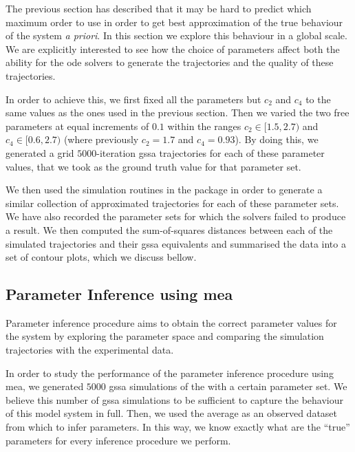 The previous section has described that it may be hard to predict which maximum order to use in order to get best approximation of the true behaviour of the system \emph{a priori}. 
In this section we explore this behaviour in a global scale.
We are explicitly interested to see how the choice of parameters affect both the ability for the \gls{ode} solvers to generate the trajectories and the quality of these trajectories.

In order to achieve this, we first fixed all the parameters but $c_2$ and $c_4$ to the same values as the ones used in the previous section.
Then we varied the two free parameters at equal increments of $0.1$ within the ranges
$c_2 \in [1.5, 2.7)$ and $c_4 \in [0.6, 2.7)$ (where previously $c_2=1.7$ and $c_4=0.93$). By doing this, we generated a grid $5000$-iteration \gls{gssa} trajectories for each of these parameter values, that we took as the ground truth value for that parameter set.

We then used the simulation routines in the \means{} package in order to generate a similar collection of approximated trajectories for each of these parameter sets. 
We have also recorded the parameter sets for which the solvers failed to produce a result. 
We then computed the sum-of-squares distances between each of the simulated trajectories and their \gls{gssa} equivalents and summarised the data into a set of contour plots, which we discuss bellow.

\subsection{Parameter Inference using \acrlong{mea}}
Parameter inference procedure aims to obtain the correct parameter values for the system by exploring the parameter space and comparing the simulation trajectories with the experimental data.

In order to study the performance of the parameter inference procedure using \acrlong{mea},
we generated $5000$ \acrfull{gssa} simulations of the \pft{} with a certain parameter set. We believe this number of \gls{gssa} simulations to be sufficient to capture the behaviour of this model system in full.
Then, we used the average as an observed dataset from which to infer parameters.
In this way, we know exactly what are the ``true'' parameters for every inference procedure we perform.

